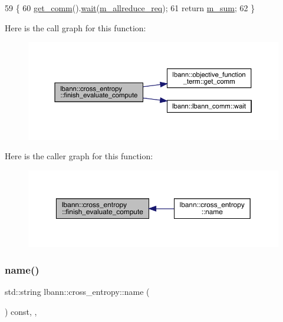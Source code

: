 \begin{DoxyCode}
59                                                                  \{
60   \hyperlink{classlbann_1_1objective__function__term_a5f89b676a26a6b76ddc26563ac87beb9}{get\_comm}().\hyperlink{classlbann_1_1lbann__comm_a30439f28cf615e1406090799c5499321}{wait}(\hyperlink{classlbann_1_1cross__entropy_a982d913d892cd9043325e2cc6a77f039}{m\_allreduce\_req});
61   \textcolor{keywordflow}{return} \hyperlink{classlbann_1_1cross__entropy_a0eea3d755b963149cb364e722a7352d8}{m\_sum};
62 \}
\end{DoxyCode}
Here is the call graph for this function\+:\nopagebreak
\begin{figure}[H]
\begin{center}
\leavevmode
\includegraphics[width=350pt]{classlbann_1_1cross__entropy_a85d6937dc70217062f7b45cb678ea1f9_cgraph}
\end{center}
\end{figure}
Here is the caller graph for this function\+:\nopagebreak
\begin{figure}[H]
\begin{center}
\leavevmode
\includegraphics[width=350pt]{classlbann_1_1cross__entropy_a85d6937dc70217062f7b45cb678ea1f9_icgraph}
\end{center}
\end{figure}
\mbox{\label{classlbann_1_1cross__entropy_a142c9188b0a251ddaf0325e1f310f205}} 
\subsubsection{\texorpdfstring{name()}{name()}}
{\footnotesize\ttfamily std\+::string lbann\+::cross\+\_\+entropy\+::name (\begin{DoxyParamCaption}{ }\end{DoxyParamCaption}) const\hspace{0.3cm}{\ttfamily [inline]}, {\ttfamily [override]}, {\ttfamily [virtual]}}

